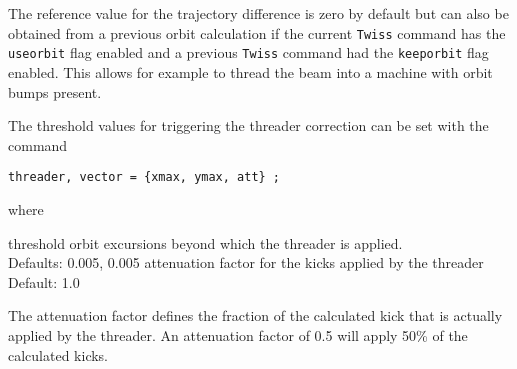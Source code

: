 The reference value for the trajectory difference is zero by default but
can also be obtained from a previous orbit calculation if the current
{\tt Twiss} command has the {\tt useorbit} flag enabled and a previous
{\tt Twiss} command had the {\tt keeporbit} flag enabled. This allows
for example to thread the beam into a machine with orbit bumps present.  

The threshold values for triggering the threader correction can be set
with the command  
\begin{verbatim}
threader, vector = {xmax, ymax, att} ;
\end{verbatim}  
where 
\begin{madlist}
 threshold orbit excursions beyond which the threader
is applied. \\ Defaults: 0.005, 0.005
 attenuation factor for the kicks applied by the threader
\\ Default: 1.0 
\end{madlist}

The attenuation factor defines the fraction of the calculated kick that
is actually applied by the threader.  
An attenuation factor of 0.5 will apply 50\% of the calculated kicks.
